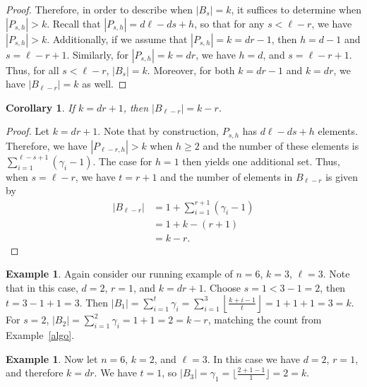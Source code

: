 \documentclass[11pt]{amsart}
\theoremstyle{plain}
\newtheorem{corollary}[theorem]{Corollary}
\theoremstyle{definition}
\newtheorem{ex}[theorem]{Example}
\begin{document}
\begin{proof}
Therefore, in order to describe when $|B_s|=k$, it suffices to determine when $|P_{s,h}|>k$. Recall that $|P_{s,h}| = d\ell-ds+h$, so that for any $s<\ell-r$, we have $|P_{s,h}|>k$. Additionally, if we assume that $|P_{s,h}|=k=dr-1$, then $h=d-1$ and $s=\ell-r+1$. Similarly, for $|P_{s,h}|=k=dr$, we have $h=d$, and $s = \ell-r+1$.
Thus, for all $s < \ell-r$, $|B_s| = k$. Moreover, for both $k=dr-1 $ and $k=dr$, we have $|B_{\ell-r}| = k$ as well. 
\end{proof}

\begin{corollary}\label{cor: sizeBl-r}
If $k=dr+1$, then $|B_{\ell-r}|=k-r$. 
\end{corollary} 
\begin{proof}
Let $k= dr+1$. Note that by construction, $P_{s,h}$ has $d\ell-ds+h$ elements. Therefore, we have $|P_{\ell-r,h}| > k$ when $h \geq 2$ and the number of these elements is $\sum \limits_{i=1}^{\ell-s+1} (\gamma_i -1)$. The case for $h=1$ then yields one additional set. Thus, when $s=\ell-r$, we have $t=r+1$ and the number of elements in $B_{\ell-r}$ is given by
\begin{align*}
    |B_{\ell -r}| &= 1+\sum_{i=1}^{r+1} (\gamma_i - 1) \\
    &= 1 + k -(r+1)\\
    &= k-r.
\end{align*}
\end{proof}

\begin{ex}
Again consider our running example of $n=6$, $k=3$, $\ell=3$. Note that in this case, $d=2$, $r=1$, and $k=dr+1$. Choose $s=1 < 3-1=2$, then $t=3-1+1=3$. Then $|B_1|=\sum_{i=1}^t \gamma_i = \sum_{i=1}^3 \left\lfloor \frac{k+i-1}{t} \right\rfloor = 1+1+1 = 3 =k$. 
For $s=2$, $|B_2|=\sum_{i=1}^2 \gamma_i=1+1=2=k-r$, matching the count from Example~\ref{algo}. 
\end{ex}

\begin{ex}
    Now let $n=6$, $k=2$, and $\ell=3$. In this case we have $d=2$, $r=1$, and therefore $k=dr$. We have $t=1$, so $|B_3|= \gamma_1 = \lfloor\frac{2+1-1}{1}\rfloor = 2 = k$. 
\end{ex}
\end{document}
